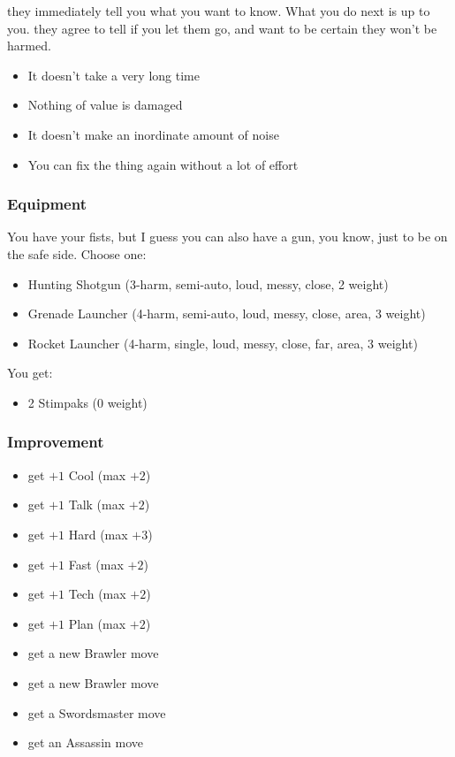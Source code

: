 
{they immediately tell you what you want to know. What you do next is up to you.}
{they agree to tell if you let them go, and want to be certain they won't be harmed.}



\begin{itemize}
\item It doesn’t take a very long time
\item Nothing of value is damaged
\item It doesn’t make an inordinate amount of noise
\item You can fix the thing again without a lot of effort
\end{itemize}

\subsubsection{Equipment}
You have your fists, but I guess you can also have a gun, you know, just to be on the safe side. Choose one:
\begin{itemize}
\item Hunting Shotgun (3-harm, semi-auto, loud, messy, close, 2 weight)
\item Grenade Launcher (4-harm, semi-auto, loud, messy, close, area, 3 weight)
\item Rocket Launcher (4-harm, single, loud, messy, close, far, area, 3 weight)
\end{itemize}

You get:
\begin{itemize}
\item 2 Stimpaks (0 weight)
\end{itemize}

\subsubsection{Improvement}
\begin{itemize}
\item get $+1$ Cool (max $+2$)
\item get $+1$ Talk (max $+2$)
\item get $+1$ Hard (max $+3$)
\item get $+1$ Fast (max $+2$)
\item get $+1$ Tech (max $+2$)
\item get $+1$ Plan (max $+2$)
\item get a new Brawler move
\item get a new Brawler move
\item get a Swordsmaster move
\item get an Assassin move
\end{itemize}